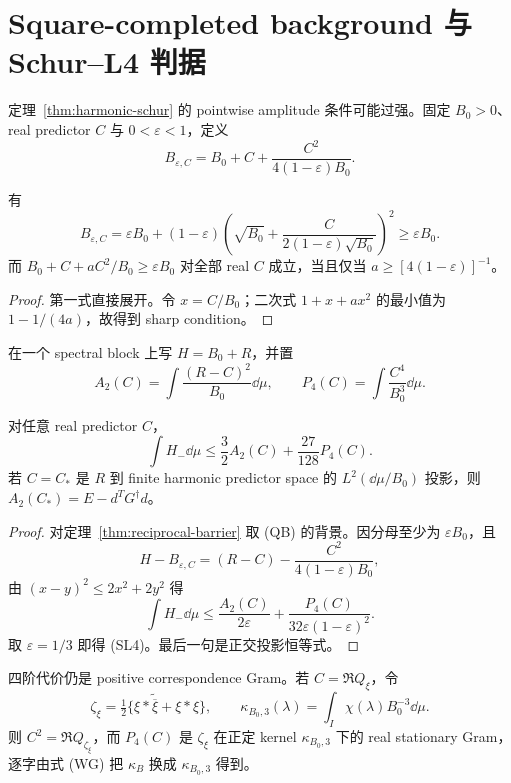 \section{Square-completed background 与 Schur--L4 判据}

定理~\ref{thm:harmonic-schur} 的 pointwise amplitude 条件可能过强。固定
$B_0>0$、real predictor $C$ 与 $0<\varepsilon<1$，定义
\[
 B_{\varepsilon,C}=B_0+C+\frac{C^2}{4(1-\varepsilon)B_0}.
\]

\begin{theorem}
\label{thm:square-background}
有
\[
 B_{\varepsilon,C}=\varepsilon B_0+(1-\varepsilon)
 \left(\sqrt{B_0}+\frac{C}{2(1-\varepsilon)\sqrt{B_0}}\right)^2
 \geq\varepsilon B_0.                            \tag{QB}
\]
而 $B_0+C+aC^2/B_0\geq\varepsilon B_0$ 对全部 real $C$ 成立，当且仅当
$a\geq[4(1-\varepsilon)]^{-1}$。
\end{theorem}

\begin{proof}
第一式直接展开。令 $x=C/B_0$；二次式 $1+x+ax^2$ 的最小值为
$1-1/(4a)$，故得到 sharp condition。
\end{proof}

在一个 spectral block 上写 $H=B_0+R$，并置
\[
 A_2(C)=\int\frac{(R-C)^2}{B_0}\dd\mu,\qquad
 P_4(C)=\int\frac{C^4}{B_0^3}\dd\mu.
\]

\begin{theorem}
\label{thm:schur-l4}
对任意 real predictor $C$，
\[
 \int H_-\dd\mu\leq\frac32A_2(C)+\frac{27}{128}P_4(C). \tag{SL4}
\]
若 $C=C_*$ 是 $R$ 到 finite harmonic predictor space 的
$L^2(\dd\mu/B_0)$ 投影，则 $A_2(C_*)=E-d^TG^\dagger d$。
\end{theorem}

\begin{proof}
对定理~\ref{thm:reciprocal-barrier} 取 (QB) 的背景。因分母至少为
$\varepsilon B_0$，且
\[
 H-B_{\varepsilon,C}=(R-C)-\frac{C^2}{4(1-\varepsilon)B_0},
\]
由 $(x-y)^2\leq2x^2+2y^2$ 得
\[
 \int H_-\dd\mu\leq
 \frac{A_2(C)}{2\varepsilon}
 +\frac{P_4(C)}{32\varepsilon(1-\varepsilon)^2}.
\]
取 $\varepsilon=1/3$ 即得 (SL4)。最后一句是正交投影恒等式。
\end{proof}

四阶代价仍是 positive correspondence Gram。若
$C=\Re Q_\xi$，令
\[
 \zeta_\xi=\tfrac12\{\xi*\widetilde{\overline\xi}+\xi*\xi\},
 \qquad
 \kappa_{B_0,3}(\lambda)=\int_I\chi(\lambda)B_0^{-3}\dd\mu.
\]
则 $C^2=\Re Q_{\zeta_\xi}$，而 $P_4(C)$ 是 $\zeta_\xi$ 在正定 kernel
$\kappa_{B_0,3}$ 下的 real stationary Gram，逐字由式 (WG) 把
$\kappa_B$ 换成 $\kappa_{B_0,3}$ 得到。

